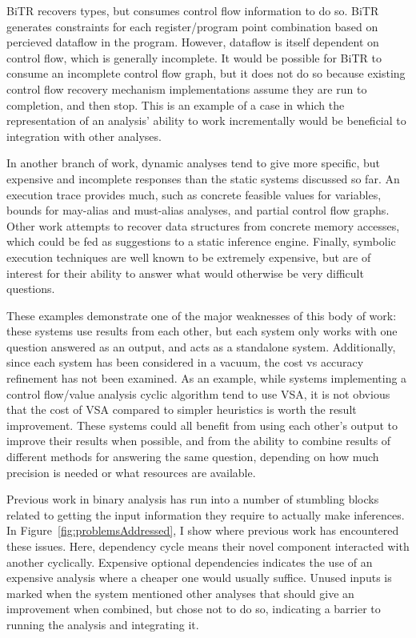 BiTR\cite{bitr} recovers types, but consumes control flow information to do so.
BiTR generates constraints for each register/program point combination based on percieved dataflow in the program.
However, dataflow is itself dependent on control flow, which is generally incomplete.
It would be possible for BiTR to consume an incomplete control flow graph, but it does not do so because existing control flow recovery mechanism implementations assume they are run to completion, and then stop.
This is an example of a case in which the representation of an analysis' ability to work incrementally would be beneficial to integration with other analyses.

In another branch of work, dynamic analyses tend to give more specific, but expensive and incomplete responses than the static systems discussed so far.
An execution trace provides much, such as concrete feasible values for variables, bounds for may-alias and must-alias analyses, and partial control flow graphs.
Other work attempts to recover data structures from concrete memory accesses, which could be fed as suggestions to a static inference engine.
Finally, symbolic execution techniques are well known to be extremely expensive, but are of interest for their ability to answer what would otherwise be very difficult questions\cite{mayhem}.

These examples demonstrate one of the major weaknesses of this body of work: these systems use results from each other, but each system only works with one question answered as an output, and acts as a standalone system.
Additionally, since each system has been considered in a vacuum, the cost vs accuracy refinement has not been examined.
As an example, while systems implementing a control flow/value analysis cyclic algorithm tend to use VSA, it is not obvious that the cost of VSA compared to simpler heuristics is worth the result improvement.
These systems could all benefit from using each other's output to improve their results when possible, and from the ability to combine results of different methods for answering the same question, depending on how much precision is needed or what resources are available.

Previous work in binary analysis has run into a number of stumbling blocks related to getting the input information they require to actually make inferences. 
In Figure~\ref{fig:problemsAddressed}, I show where previous work has encountered these issues.
Here, dependency cycle means their novel component interacted with another cyclically.
Expensive optional dependencies indicates the use of an expensive analysis where a cheaper one would usually suffice.
Unused inputs is marked when the system mentioned other analyses that should give an improvement when combined, but chose not to do so, indicating a barrier to running the analysis and integrating it.

